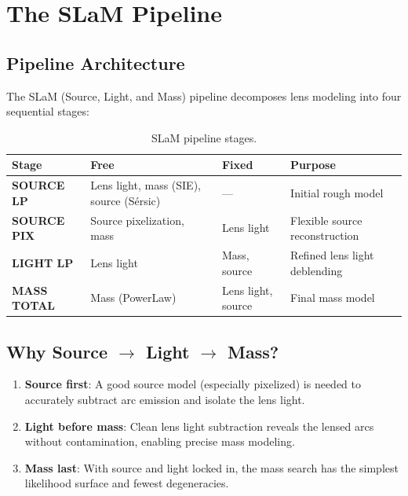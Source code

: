 \documentclass[11pt, letterpaper]{article}
\begin{document}
\section{The SLaM Pipeline}
\label{sec:slam}

\subsection{Pipeline Architecture}

The SLaM (Source, Light, and Mass) pipeline decomposes lens modeling
into four sequential stages:

\begin{table}[H]
\centering
\caption{SLaM pipeline stages.}
\begin{tabular}{lp{3cm}p{3cm}p{4cm}}
\toprule
Stage & Free & Fixed & Purpose \\
\midrule
\textbf{SOURCE LP} & Lens light, mass (SIE), source (S\'ersic)
  & --- & Initial rough model \\
\textbf{SOURCE PIX} & Source pixelization, mass
  & Lens light & Flexible source reconstruction \\
\textbf{LIGHT LP} & Lens light
  & Mass, source & Refined lens light deblending \\
\textbf{MASS TOTAL} & Mass (PowerLaw)
  & Lens light, source & Final mass model \\
\bottomrule
\end{tabular}
\label{tab:slam-stages}
\end{table}

\subsection{Why Source $\to$ Light $\to$ Mass?}

\begin{enumerate}
  \item \textbf{Source first}: A good source model (especially pixelized)
    is needed to accurately subtract arc emission and isolate the lens light.
  \item \textbf{Light before mass}: Clean lens light subtraction reveals
    the lensed arcs without contamination, enabling precise mass modeling.
  \item \textbf{Mass last}: With source and light locked in, the mass
    search has the simplest likelihood surface and fewest degeneracies.
\end{enumerate}
\end{document}
